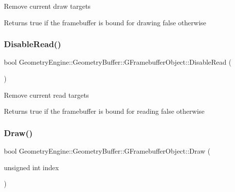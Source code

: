 Remove current draw targets \begin{DoxyReturn}{Returns}
true if the framebuffer is bound for drawing false otherwise 
\end{DoxyReturn}
\mbox{\label{class_geometry_engine_1_1_geometry_buffer_1_1_g_framebuffer_object_a916dea3e3d84f0c3126f853c91de64ed}} 
\subsubsection{\texorpdfstring{DisableRead()}{DisableRead()}}
{\footnotesize\ttfamily bool Geometry\+Engine\+::\+Geometry\+Buffer\+::\+G\+Framebuffer\+Object\+::\+Disable\+Read (\begin{DoxyParamCaption}{ }\end{DoxyParamCaption})}

Remove current read targets \begin{DoxyReturn}{Returns}
true if the framebuffer is bound for reading false otherwise 
\end{DoxyReturn}
\mbox{\label{class_geometry_engine_1_1_geometry_buffer_1_1_g_framebuffer_object_a7d7a7a938f5889a79701d5dd7af17ca7}} 
\subsubsection{\texorpdfstring{Draw()}{Draw()}\hspace{0.1cm}{\footnotesize\ttfamily [1/2]}}
{\footnotesize\ttfamily bool Geometry\+Engine\+::\+Geometry\+Buffer\+::\+G\+Framebuffer\+Object\+::\+Draw (\begin{DoxyParamCaption}\item[{unsigned int}]{index }\end{DoxyParamCaption})}

